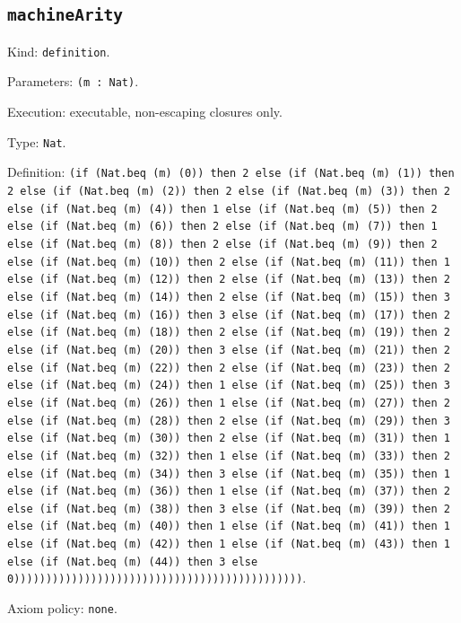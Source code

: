 \documentclass[11pt]{article}
\begin{document}
\subsection*{\texttt{machineArity}}
\noindent Kind: \texttt{definition}.\par
\noindent Parameters: \texttt{(m : Nat)}.\par
\noindent Execution: executable, non-escaping closures only.\par
\noindent Type: \texttt{Nat}.\par
\noindent Definition: \texttt{(if (Nat.beq (m) (0)) then 2 else (if (Nat.beq (m) (1)) then 2 else (if (Nat.beq (m) (2)) then 2 else (if (Nat.beq (m) (3)) then 2 else (if (Nat.beq (m) (4)) then 1 else (if (Nat.beq (m) (5)) then 2 else (if (Nat.beq (m) (6)) then 2 else (if (Nat.beq (m) (7)) then 1 else (if (Nat.beq (m) (8)) then 2 else (if (Nat.beq (m) (9)) then 2 else (if (Nat.beq (m) (10)) then 2 else (if (Nat.beq (m) (11)) then 1 else (if (Nat.beq (m) (12)) then 2 else (if (Nat.beq (m) (13)) then 2 else (if (Nat.beq (m) (14)) then 2 else (if (Nat.beq (m) (15)) then 3 else (if (Nat.beq (m) (16)) then 3 else (if (Nat.beq (m) (17)) then 2 else (if (Nat.beq (m) (18)) then 2 else (if (Nat.beq (m) (19)) then 2 else (if (Nat.beq (m) (20)) then 3 else (if (Nat.beq (m) (21)) then 2 else (if (Nat.beq (m) (22)) then 2 else (if (Nat.beq (m) (23)) then 2 else (if (Nat.beq (m) (24)) then 1 else (if (Nat.beq (m) (25)) then 3 else (if (Nat.beq (m) (26)) then 1 else (if (Nat.beq (m) (27)) then 2 else (if (Nat.beq (m) (28)) then 2 else (if (Nat.beq (m) (29)) then 3 else (if (Nat.beq (m) (30)) then 2 else (if (Nat.beq (m) (31)) then 1 else (if (Nat.beq (m) (32)) then 1 else (if (Nat.beq (m) (33)) then 2 else (if (Nat.beq (m) (34)) then 3 else (if (Nat.beq (m) (35)) then 1 else (if (Nat.beq (m) (36)) then 1 else (if (Nat.beq (m) (37)) then 2 else (if (Nat.beq (m) (38)) then 3 else (if (Nat.beq (m) (39)) then 2 else (if (Nat.beq (m) (40)) then 1 else (if (Nat.beq (m) (41)) then 1 else (if (Nat.beq (m) (42)) then 1 else (if (Nat.beq (m) (43)) then 1 else (if (Nat.beq (m) (44)) then 3 else 0)))))))))))))))))))))))))))))))))))))))))))))}.\par
\noindent Axiom policy: \texttt{none}.\par
\end{document}
